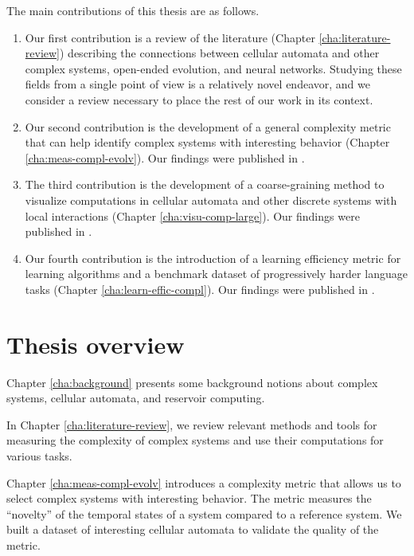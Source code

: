 The main contributions of this thesis are as follows.
\begin{enumerate}
  \item Our first contribution is a review of the literature (Chapter \ref{cha:literature-review})
        describing the connections between cellular automata
        and other complex systems, open-ended evolution, and neural networks.
        Studying these fields from a single point of view is a relatively novel
        endeavor, and we consider a review necessary to place the rest of our
        work in its context.

  \item Our second contribution is the development of a general complexity metric that can help identify
        complex systems with interesting behavior (Chapter \ref{cha:meas-compl-evolv}). Our findings were published in \cite{cisnerosEvolvingStructuresComplex2019}.

  \item The third contribution is the development of a coarse-graining method to visualize computations in
        cellular automata and other discrete systems with local interactions (Chapter \ref{cha:visu-comp-large}). Our findings were published in \cite{cisnerosVisualizingComputationLargescale2020}.

  \item Our fourth contribution is the introduction of a learning efficiency metric for learning
        algorithms and a benchmark dataset of progressively harder
        language tasks (Chapter \ref{cha:learn-effic-compl}). Our findings were published in \cite{cisnerosBenchmarkingLearningEfficiency2022}.
\end{enumerate}

\section{Thesis overview}


Chapter \ref{cha:background} presents some background notions about complex
systems, cellular automata, and reservoir computing.

In Chapter \ref{cha:literature-review}, we review relevant methods and tools for measuring
the complexity of complex systems and use their computations for
various tasks.

Chapter \ref{cha:meas-compl-evolv} introduces a complexity metric that allows us 
to select complex systems with interesting behavior. The metric measures the
``novelty'' of the temporal states of a system compared to a reference system. We
built a dataset of interesting cellular automata to validate the quality of the
metric.

